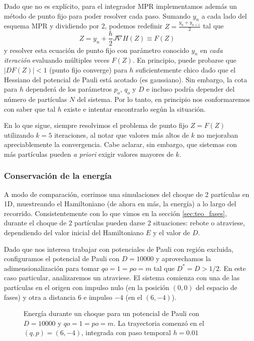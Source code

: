 Dado que no es explícito, para el integrador MPR implementamos además un método de punto fijo para poder resolver cada paso.
Sumando $y_n$ a cada lado del esquema MPR y dividiendo por 2, podemos redefinir $Z = \frac{y_n+y_{n+1}}{2}$ tal que
\[ Z = y_n + \frac{h}{2}J\nabla H(Z) \equiv F(Z) \]
y resolver esta ecuación de punto fijo con parámetro conocido $y_n$ en \textit{cada iteración} evaluando múltiples veces $F(Z)$.
En principio, puede probarse que $|DF(Z)|<1$ (punto fijo converge) para $h$ suficientemente chico dado que el Hessiano del potencial de Pauli está acotado (es gaussiano).
Sin embargo, la cota para $h$ dependerá de los parámetros $p_o$, $q_o$ y $D$ e incluso podría depender del número de partículas $N$ del sistema.
Por lo tanto, en principio nos conformaremos con saber que tal $h$ existe e intentar encontrarlo según la situación.

En lo que sigue, siempre resolvimos el problema de punto fijo $Z = F(Z)$ utilizando $k=5$ iteraciones, al notar que valores más altos de $k$ no mejoraban apreciablemente la convergencia.
Cabe aclarar, sin embargo, que sistemas con más partículas pueden \textit{a priori} exigir valores mayores de $k$.

\subsubsection{Conservación de la energía}

A modo de comparación, corrimos una simulaciones del choque de 2 partículas en 1D, muestreando el Hamiltoniano (de ahora en más, la energía) a lo largo del recorrido.
Consistentemente con lo que vimos en la sección \ref{sec:teo_fases}, durante el choque de 2 partículas pueden darse 2 situaciones: rebote o atraviese, dependiendo del valor inicial del Hamiltoniano $E$ y el valor de $D$.

Dado que nos interesa trabajar con potenciales de Pauli con región excluida, configuramos el potencial de Pauli con $D = 10000$ y aprovechamos la adimensionalización para tomar $qo = 1 = po = m$ tal que 
$D^*=D>1/2$.
En este caso particular, analizaremos un atraviese.
El sistema comienza con una de las partículas en el origen con impulso nulo (en la posición $(0, 0)$ del espacio de fases) y otra a distancia $6$ e impulso $-4$ (en el $(6, -4)$).

\begin{figure}[H]
	\centering
	\caption{Energía durante un choque para un potencial de Pauli con $D = 10000$ y $qo = 1 = po = m$. La trayectoria comenzó en el $(q, p) = (6, -4)$, integrada con paso temporal $h=0.01$}
	\label{fig:energ_choq}
\end{figure}

